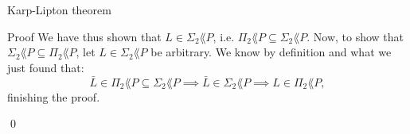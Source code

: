 \documentclass[a4paper]{article}
\begin{document}
\begin{parag}{Karp-Lipton theorem}
\begin{subparag}{Proof}
        We have thus shown that $L \in \Sigma_2\lang{P}$, i.e. $\Pi_2 \lang{P} \subseteq \Sigma_2 \lang{P}$. Now, to show that $\Sigma_2 \lang{P} \subseteq \Pi_2 \lang{P}$, let $L \in \Sigma_2 \lang{P}$ be arbitrary. We know by definition and what we just found that: 
        \[\bar{L} \in \Pi_2 \lang{P} \subseteq \Sigma_2 \lang{P} \implies \bar{L} \in \Sigma_2 \lang{P} \implies L \in \Pi_2 \lang{P},\]
        finishing the proof.
        
        \qed
    \end{subparag}
\end{parag}
\end{document}
